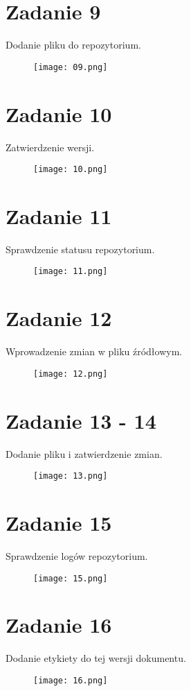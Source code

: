 \documentclass[fleqn,onecolumn,a4paper,12pt,titlepage]{article}
\begin{document}
\section*{Zadanie 9}
Dodanie pliku do repozytorium.
\begin{figure}[H]%
    \centering\texttt{[image: 09.png]}
\end{figure}

\section*{Zadanie 10}
Zatwierdzenie wersji.
\begin{figure}[H]%
    \centering\texttt{[image: 10.png]}
\end{figure}

\section*{Zadanie 11}
Sprawdzenie statusu repozytorium.
\begin{figure}[H]%
    \centering\texttt{[image: 11.png]}
\end{figure}

\section*{Zadanie 12}
Wprowadzenie zmian w pliku źródłowym.
\begin{figure}[H]%
    \centering\texttt{[image: 12.png]}
\end{figure}

\section*{Zadanie 13 - 14}
Dodanie pliku i zatwierdzenie zmian.
\begin{figure}[H]%
    \centering\texttt{[image: 13.png]}
\end{figure}

\section*{Zadanie 15}
Sprawdzenie logów repozytorium.
\begin{figure}[H]%
    \centering\texttt{[image: 15.png]}
\end{figure}

\section*{Zadanie 16}
Dodanie etykiety do tej wersji dokumentu.
\begin{figure}[H]%
    \centering\texttt{[image: 16.png]}
\end{figure}
\end{document}
